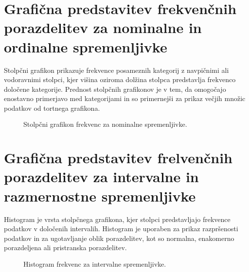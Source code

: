 \section{Grafična predstavitev frekvenčnih porazdelitev za nominalne in ordinalne spremenljivke}

Stolpčni grafikon prikazuje frekvence posameznih kategorij z navpičnimi ali vodoravnimi stolpci, kjer višina oziroma dolžina stolpca predstavlja frekvenco določene kategorije. Prednost stolpčnih grafikonov je v tem, da omogočajo enostavno primerjavo med kategorijami in so primernejši za prikaz večjih množic podatkov od tortnega grafikona.

\begin{figure}
    \centering
    \caption{Stolpčni grafikon frekvenc za nominalne spremenljivke.}
    \end{figure}

\section{Grafična predstavitev frelvenčnih porazdelitev za intervalne in razmernostne spremenljivke}

Histogram je vrsta stolpčnega grafikona, kjer stolpci predstavljajo frekvence podatkov v določenih intervalih. Histogram je uporaben za prikaz razpršenosti podatkov in za ugotavljanje oblik porazdelitev, kot so normalna, enakomerno porazdeljena ali pristranska porazdelitev.

\begin{figure}
    \centering
    \caption{Histogram frekvenc za intervalne spremenljivke.}
\end{figure}

